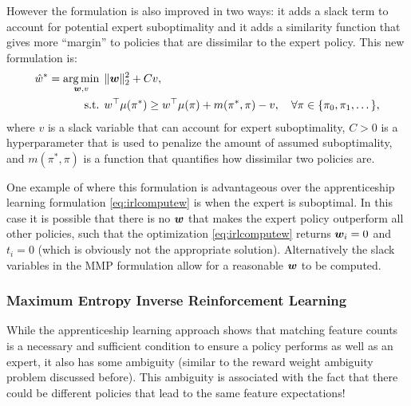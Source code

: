 However the formulation is also improved in two ways: it adds a slack term to account for potential expert suboptimality and it adds a similarity function that gives more ``margin'' to policies that are dissimilar to the expert policy. This new formulation is:
\begin{equation} \label{eq:mmp}
\begin{split}
\hat{w}^* = \underset{\bm{w}, v}{\arg\min} \:\: & \lVert \bm{w} \rVert_2^2 + Cv,\\
\text{s.t.} \:\:& w^\top \mu(\pi^*) \geq w^\top \mu(\pi) + m(\pi^*, \pi) - v, \quad \forall \pi \in  \{\pi_0, \pi_1, \dots\},
\end{split}
\end{equation}
where $v$ is a slack variable that can account for expert suboptimality, $C > 0$ is a hyperparameter that is used to penalize the amount of assumed suboptimality, and $m(\pi^*, \pi)$ is a function that quantifies how dissimilar two policies are.

One example of where this formulation is advantageous over the apprenticeship learning formulation \eqref{eq:irlcomputew} is when the expert is suboptimal. In this case it is possible that there is no $\bm{w}$ that makes the expert policy outperform all other policies, such that the optimization \eqref{eq:irlcomputew} returns $\bm{w}_i = 0$ and $t_i = 0$ (which is obviously not the appropriate solution). Alternatively the slack variables in the MMP formulation allow for a reasonable $\bm{w}$ to be computed. 

\subsubsection{Maximum Entropy Inverse Reinforcement Learning}
While the apprenticeship learning approach shows that matching feature counts is a necessary and sufficient condition to ensure a policy performs as well as an expert, it also has some ambiguity (similar to the reward weight ambiguity problem discussed before). This ambiguity is associated with the fact that there could be different policies that lead to the same feature expectations! 

